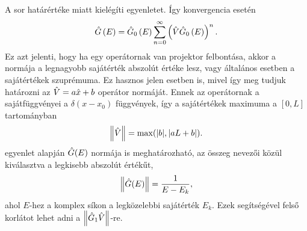 A sor határértéke  miatt kielégíti  egyenletet. Így konvergencia esetén
\begin{equation}
	\hat{G}\left(E\right) = \hat{G}_0\left(E\right)\sum_{n=0}^\infty\left(\hat{V}\hat{G}_0\left(E\right)\right)^n.
\end{equation}
Ez azt jelenti, hogy ha egy operátornak van projektor felbontása, akkor a normája a legnagyobb sajátérték abszolút értéke lesz, vagy általános esetben a sajátértékek szuprémuma. Ez hasznos jelen esetben is, mivel így meg tudjuk határozni az $\hat{V}=a\hat{x}+b$ operátor normáját. Ennek az operátornak a sajátfüggvényei a $\delta(x-x_0)$ függvények, így a sajátértékek maximuma a $[0,L]$ tartományban
\begin{equation}
	\left\lVert \hat{V} \right\rVert=\max(\rvert b \lvert, \lvert aL+b\rvert).
\end{equation}
 egyenlet alapján $\hat{G}(E)$ normája is meghatározható, az összeg nevezői közül kiválasztva a legkisebb abszolút értékűt,
\begin{equation}
	\left\lVert \hat{G}(E) \right\rVert=\frac{1}{E-E_k},
\end{equation}
ahol $E$-hez a komplex síkon a legközelebbi sajátérték $E_k$. Ezek segítségével felső korlátot lehet adni a $\left\lVert \hat{G}_1\hat{V} \right\rVert$-re.

